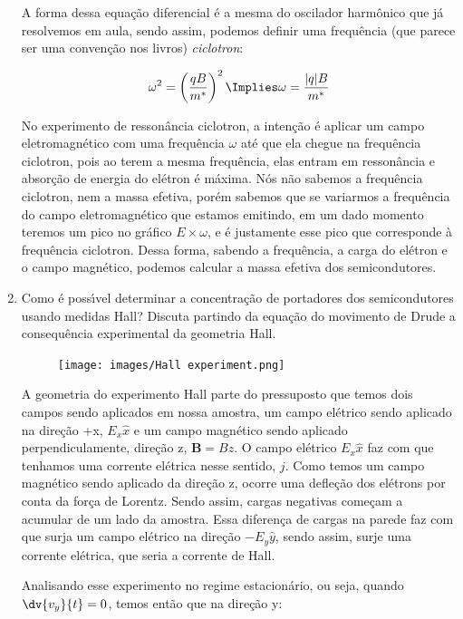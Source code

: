 \begin{enumerate}
  A forma dessa equação diferencial é a mesma do oscilador harmônico que já resolvemos em aula, sendo assim, podemos definir uma frequência (que parece ser uma convenção nos livros) \textit{ciclotron}:

  \begin{equation}
      \omega^2 = \left(\frac{qB}{m^*}\right)^2 \Implies \omega = \frac{|q|B}{m^*} 
  \end{equation}
  
  No experimento de ressonância ciclotron, a intenção é aplicar um campo eletromagnético com uma frequência $\omega$ até que ela chegue na frequência ciclotron, pois ao terem a mesma frequência, elas entram em ressonância e absorção de energia do elétron é máxima. Nós não sabemos a frequência ciclotron, nem a massa efetiva, porém sabemos que se variarmos a frequência do campo eletromagnético que estamos emitindo, em um dado momento teremos um pico no gráfico $E \times \omega$, e é justamente esse pico que corresponde à frequência ciclotron. Dessa forma, sabendo a frequência, a carga do elétron e o campo magnético, podemos calcular a massa efetiva dos semicondutores.

\item Como é possı́vel determinar a concentração de portadores dos semicondutores usando medidas Hall? Discuta partindo da equação do movimento de Drude a consequência experimental da geometria Hall.


\begin{figure}[htbp]
  \centering
  \texttt{[image: images/Hall experiment.png]}
\end{figure}
  
A geometria do experimento Hall parte do pressuposto que temos dois campos sendo aplicados em nossa amostra, um campo elétrico sendo aplicado na direção +x, $E_x\hat{x}$ e um campo magnético sendo aplicado perpendiculamente, direção z, $\mathbf{B} = Bz$. O campo elétrico $E_x\hat{x}$ faz com que tenhamos uma corrente elétrica nesse sentido, $j$. Como temos um campo magnético sendo aplicado da direção z, ocorre uma defleção dos elétrons por conta da força de Lorentz. Sendo assim, cargas negativas começam a acumular de um lado da amostra. Essa diferença de cargas na parede faz com que surja um campo elétrico na direção $-E_y\hat{y}$, sendo assim, surje uma corrente elétrica, que seria a corrente de Hall.

Analisando esse experimento no regime estacionário, ou seja, quando $\dv{v_y}{t} = 0$, temos então que na direção y:


\end{enumerate}
